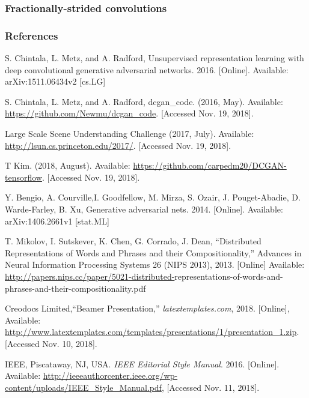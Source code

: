 \documentclass{beamer}
\begin{document}

\begin{frame}[allowframebreaks]
\frametitle{Fractionally-strided convolutions}

\end{frame}


\begin{frame}[allowframebreaks]
\frametitle{References}
\footnotesize{
\begin{thebibliography}{99} %

 S. Chintala, L. Metz, and A. Radford, 
Unsupervised representation learning with deep convolutional generative 
adversarial networks.  2016. [Online]. Available: arXiv:1511.06434v2 [cs.LG]

 S. Chintala, L. Metz, and A. Radford, dcgan\_code. (2016,
May).  Available: \url{https://github.com/Newmu/dcgan\_code}. [Accessed Nov. 19,
2018].

 Large Scale Scene Understanding Challenge (2017, July).
Available: \url{http://lsun.cs.princeton.edu/2017/}. [Accessed Nov. 19, 2018].

 T Kim. (2018, August).  Available: \url{https://github.com/carpedm20/DCGAN-tensorflow}. [Accessed Nov. 19, 2018].


 Y. Bengio, A. Courville,I. Goodfellow, M. Mirza, S. Ozair,  
J. Pouget-Abadie,  D. Warde-Farley, B. Xu, Generative adversarial nets. 2014. 
[Online]. Available: arXiv:1406.2661v1 [stat.ML]

 T. Mikolov, I. Sutskever, K. Chen, G. Corrado, J. Dean,
``Distributed Representations of Words and Phrases and their Compositionality,''
Advances in Neural Information Processing Systems 26 (NIPS 2013), 2013. 
[Online] Available: \url{http://papers.nips.cc/paper/5021-distributed-}representations-of-words-and-phrases-and-their-compositionality.pdf

 Creodocs Limited,``Beamer Presentation,''
\emph{latextemplates.com}, 2018. [Online], Available: 
\url{http://www.latextemplates.com/templates/presentations/1/presentation\_1.zip}. [Accessed Nov. 10, 2018].

 IEEE, Piscataway, NJ, USA. \emph{IEEE Editorial Style Manual}. 2016.
[Online]. Available: \url{http://ieeeauthorcenter.ieee.org/wp-content/uploads/IEEE\_Style_Manual.pdf}, [Accessed Nov. 11, 2018].


\end{thebibliography}}
\end{frame}
\end{document}
